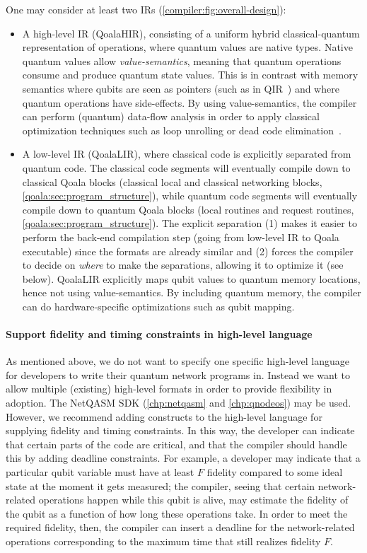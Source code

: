 One may consider at least two \ac{IR}s (\cref{compiler:fig:overall-design}):
\begin{itemize}
  \item A high-level \ac{IR} (QoalaHIR), consisting of a uniform hybrid classical-quantum representation of operations, where quantum values are native types.
  Native quantum values allow \emph{value-semantics}, meaning that quantum operations consume and produce quantum state values.
  This is in contrast with memory semantics where qubits are seen as pointers (such as in QIR~\cite{haner_software_2018, geller_introducing_2020}) and where quantum operations have side-effects.
  By using value-semantics, the compiler can perform (quantum) data-flow analysis in order to apply classical optimization techniques such as loop unrolling or dead code elimination~\cite{peduri_qssa_2022, ittah_enabling_2022}.
  \item A low-level \ac{IR} (QoalaLIR), where classical code is explicitly separated from quantum code.
  The classical code segments will eventually compile down to classical Qoala blocks (classical local and classical networking blocks, \cref{qoala:sec:program_structure}), while quantum code segments will eventually compile down to quantum Qoala blocks (local routines and request routines, \cref{qoala:sec:program_structure}).
  The explicit separation (1) makes it easier to perform the back-end compilation step (going from low-level IR to Qoala executable) since the formats are already similar and (2) forces the compiler to decide on \emph{where} to make the separations, allowing it to optimize it (see below).
  QoalaLIR explicitly maps qubit values to quantum memory locations, hence not using value-semantics.
  By including quantum memory, the compiler can do hardware-specific optimizations such as qubit mapping.
\end{itemize}


\paragraph{Support fidelity and timing constraints in high-level language}
As mentioned above, we do not want to specify one specific high-level language for developers to write their quantum network programs in.
Instead we want to allow multiple (existing) high-level formats in order to provide flexibility in adoption.
The NetQASM SDK (\cref{chp:netqasm} and \cref{chp:qnodeos}) may be used.
However, we recommend adding constructs to the high-level language for supplying fidelity and timing constraints.
In this way, the developer can indicate that certain parts of the code are critical, and that the compiler should handle this by adding deadline constraints.
For example, a developer may indicate that a particular qubit variable must have at least $F$ fidelity compared to some ideal state at the moment it gets measured;
the compiler, seeing that certain network-related operations happen while this qubit is alive, may estimate the fidelity of the qubit as a function of how long these operations take.
In order to meet the required fidelity, then, the compiler can insert a deadline for the network-related operations corresponding to the maximum time that still realizes fidelity $F$.


